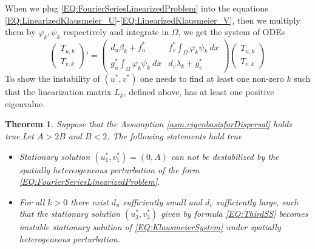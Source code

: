\documentclass[12pt, a4paper]{article}
\theoremstyle{break}
\newtheorem{thm}{Theorem}[section]
\theoremstyle{break}
\theoremstyle{break}
\theoremstyle{break}
\theoremstyle{break}
\theoremstyle{break}
\theoremstyle{break}
\begin{document}
When we plug \eqref{EQ:FourierSeriesLinearizedProblem} into the equations \eqref{EQ:LinearizedKlausmeier_U}-\eqref{EQ:LinearizedKlausmeier_V}, then we multiply them by $\varphi_k, \psi_k$ respectively and integrate in $\Omega$, we get the system of ODEs
\begin{equation}
    \label{EQ:ODEFORT_U_T_V}
    \begin{pmatrix}
        T_{u, k} \\ T_{v, k}
    \end{pmatrix}'
    =
    \begin{pmatrix}
        d_u \beta_k + f_u^* & f_v^* \int_\Omega \varphi_k \psi_k \:dx \\
        g_u^* \int_\Omega \varphi_k \psi_k \:dx & d_v \lambda_k + g_v^*
    \end{pmatrix}
    \begin{pmatrix}
        T_{u, k} \\ T_{v, k}
    \end{pmatrix}
\end{equation}
To show the instability of $(u^*, v^*)$ one needs to find at least one non-zero $k$ such that the linearization matrix $L_k$, defined above, has at least one positive eigenvalue.
\begin{thm}
    Suppose that the Assumption \ref{asm:eigenbasisforDispersal} holds true.Let $A > 2B$ and $B < 2$. The following statements hold true
    \begin{itemize}
        \item Stationary solution $(u_1^*, v_1^*) = (0, A)$ can not be destabilized by the spatially hetereogeneous perturbation of the form \eqref{EQ:FourierSeriesLinearizedProblem}.
        \item For all $k > 0$ there exist $d_u$ sufficiently small and $d_v$ sufficiently large, such that the stationary solution $(u_3^*, v_3^*)$ given by formula \eqref{EQ:ThirdSS} becomes unstable stationary solution of \eqref{EQ:KlausmeierSystem} under spatially heterogeneous perturbation.
    \end{itemize}
\end{thm}
\end{document}

